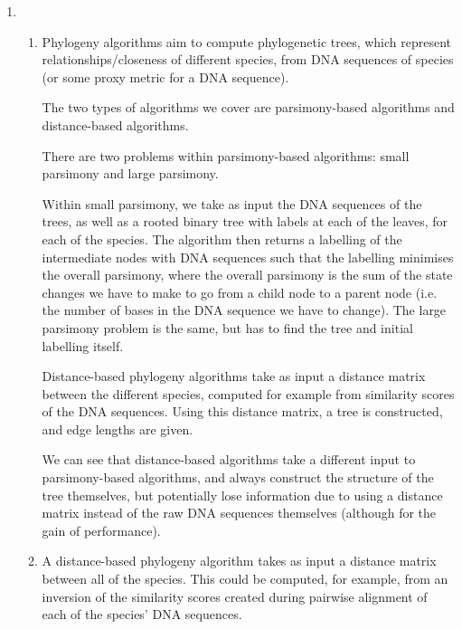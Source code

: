 


\begin{enumerate}[label=(\alph*)]

  \item

    \begin{enumerate}[label=(\roman*)]

      \item

        Phylogeny algorithms aim to compute phylogenetic trees, which represent relationships/closeness of different species, from DNA sequences of species (or some proxy metric for a DNA sequence).

        The two types of algorithms we cover are parsimony-based algorithms and distance-based algorithms.

        There are two problems within parsimony-based algorithms: small parsimony and large parsimony.

        Within small parsimony, we take as input the DNA sequences of the trees, as well as a rooted binary tree with labels at each of the leaves, for each of the species. The algorithm then returns a labelling of the intermediate nodes with DNA sequences such that the labelling minimises the overall parsimony, where the overall parsimony is the sum of the state changes we have to make to go from a child node to a parent node (i.e. the number of bases in the DNA sequence we have to change). The large parsimony problem is the same, but has to find the tree and initial labelling itself.

        Distance-based phylogeny algorithms take as input a distance matrix between the different species, computed for example from similarity scores of the DNA sequences. Using this distance matrix, a tree is constructed, and edge lengths are given.

        We can see that distance-based algorithms take a different input to parsimony-based algorithms, and always construct the structure of the tree themselves, but potentially lose information due to using a distance matrix instead of the raw DNA sequences themselves (although for the gain of performance).

        \item
          A distance-based phylogeny algorithm takes as input a distance matrix between all of the species. This could be computed, for example, from an inversion of the similarity scores created during pairwise alignment of each of the species' DNA sequences. 


\end{enumerate}
\end{enumerate}
